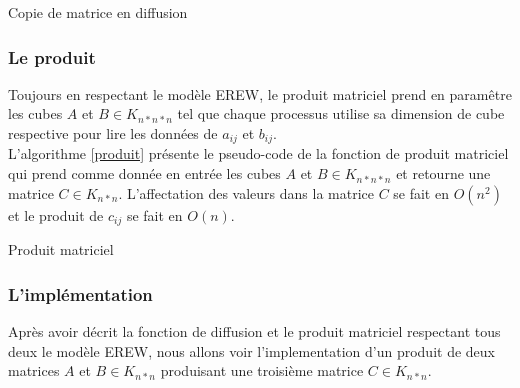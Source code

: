\documentclass[oneside,11pt]{article}
\begin{document}
\begin{empfile}
\incmargin{1em}
\begin{algorithm}
  \label{diffusion}
  \caption{Copie de matrice en diffusion}
\end{algorithm}

\subsubsection{Le produit}

Toujours en respectant le modèle EREW, le produit matriciel prend en paramêtre les cubes $A$ et $B \in K_{n*n*n}$ tel que chaque processus utilise sa dimension de cube respective pour lire les données de $a_{ij}$ et $b_{ij}$.\\

L'algorithme \ref{produit} présente le pseudo-code de la fonction de produit matriciel qui prend comme donnée en entrée les cubes $A$ et $B \in K_{n*n*n}$ et retourne une matrice $C \in K_{n*n}$. L'affectation des valeurs dans la matrice $C$ se fait en $O(n^2)$ et le produit de $c_{ij}$ se fait en $O(n)$.

\incmargin{1em}
\begin{algorithm}
  \label{produit}
  \caption{Produit matriciel}
\end{algorithm}

\subsubsection{L'implémentation}

Après avoir décrit la fonction de diffusion et le produit matriciel respectant tous deux le modèle EREW, nous allons voir l'implementation d'un produit de deux matrices $A$ et $B \in K_{n*n}$ produisant une troisième matrice $C \in K_{n*n}$.\\


\end{empfile}
\end{document}

